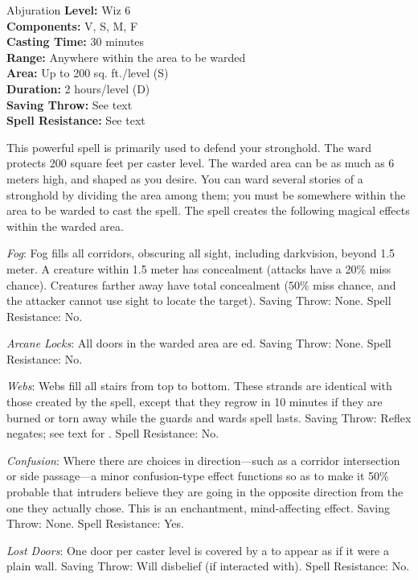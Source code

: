 {Abjuration}
{
	\textbf{Level:}
	Wiz 6\\
	\textbf{Components:}
	V, S, M, F\\
	\textbf{Casting Time:}
	30 minutes\\
	\textbf{Range:}
	Anywhere within the area to be warded\\
	\textbf{Area:}
	Up to 200 sq. ft./level (S)\\
	\textbf{Duration:}
	2 hours/level (D)\\
	\textbf{Saving Throw:}
	See text\\
	\textbf{Spell Resistance:}
	See text\\
}
{
	This powerful spell is primarily used to defend your stronghold. The ward protects 200 square feet per caster level. The warded area can be as much as 6 meters high, and shaped as you desire. You can ward several stories of a stronghold by dividing the area among them; you must be somewhere within the area to be warded to cast the spell. The spell creates the following magical effects within the warded area.

	\textit{Fog}:
	Fog fills all corridors, obscuring all sight, including darkvision, beyond 1.5 meter. A creature within 1.5 meter has concealment (attacks have a 20\% miss chance). Creatures farther away have total concealment (50\% miss chance, and the attacker cannot use sight to locate the target). Saving Throw: None. Spell Resistance: No.

	\textit{Arcane Locks}:
	All doors in the warded area are ed. Saving Throw: None. Spell Resistance: No.

	\textit{Webs}:
	Webs fill all stairs from top to bottom. These strands are identical with those created by the  spell, except that they regrow in 10 minutes if they are burned or torn away while the guards and wards spell lasts. Saving Throw: Reflex negates; see text for . Spell Resistance: No.

	\textit{Confusion}:
	Where there are choices in direction---such as a corridor intersection or side passage---a minor confusion-type effect functions so as to make it 50\% probable that intruders believe they are going in the opposite direction from the one they actually chose. This is an enchantment, mind-affecting effect. Saving Throw: None. Spell Resistance: Yes.

	\textit{Lost Doors}:
	One door per caster level is covered by a  to appear as if it were a plain wall. Saving Throw: Will disbelief (if interacted with). Spell Resistance: No.

}
